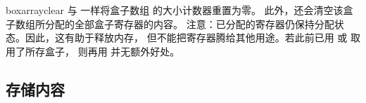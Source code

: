 \clearpage
\begin{docCommand}[doc new=2015-07-13]{boxarrayclear}{}
  与  一样将盒子数组  的大小计数器重置为零。
  此外，还会清空该盒子数组所分配的全部盒子寄存器的内容。
  注意：已分配的寄存器仍保持分配状态。因此，这有助于释放内存，
  但不能把寄存器腾给其他用途。若此前已用 
  或  取用了所存盒子，
  则再用  并无额外好处。
\begin{dispListing}
\boxarrayclear            %
\boxarrayclear[myarray]   %
\end{dispListing}
\end{docCommand}



\subsection{存储内容}\label{subsec:magazine_storing}

